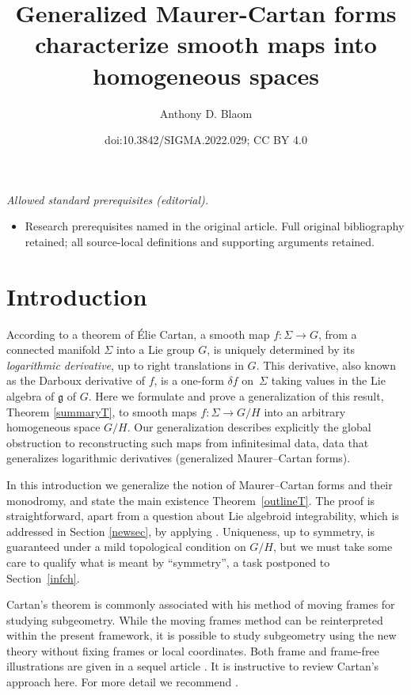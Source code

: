 \documentclass[10pt,a4paper]{amsart}
\title{Generalized Maurer-Cartan forms characterize smooth maps into homogeneous spaces}
\author{Anthony D. Blaom}
\date{doi:10.3842/SIGMA.2022.029; CC BY 4.0}
\numberwithin{equation}{section}
\begin{document}
\maketitle
\noindent\textit{Allowed standard prerequisites (editorial).}\begin{itemize}
\item Research prerequisites named in the original article. Full original bibliography retained; all source-local definitions and supporting arguments retained.
\end{itemize}\medskip
\section{Introduction}%
According to a theorem of \'Elie Cartan, a smooth map $f \colon \Sigma \rightarrow G$, from a
connected manifold $\Sigma$ into a Lie group $G$, is uniquely
determined by its {\it logarithmic derivative}, up to right
translations in $G$. This derivative, also known as the Darboux
derivative of $f$, is a one-form $\delta f$ on~$\Sigma $ taking values
in the Lie algebra of ${\mathfrak g} $ of $G$. Here we formulate and
prove a generalization of this result, Theorem \ref{summaryT}, to
smooth maps $f \colon \Sigma \rightarrow G/H$ into an arbitrary
homogeneous space $G/H$. Our generalization describes explicitly the
global obstruction to reconstructing such maps from infinitesimal
data, data that generalizes logarithmic derivatives (generalized
Maurer--Cartan forms).

In this introduction we generalize the notion of Maurer--Cartan forms
and their monodromy, and state the main existence Theorem~\ref{outlineT}. The proof is straightforward, apart from a question
about Lie algebroid integrability, which is addressed in Section
\ref{newsec}, by applying \cite{Crainic_Fernandes_03}. Uniqueness, up
to symmetry, is guaranteed under a mild topological condition on
$G/H$, but we must take some care to qualify what is meant by
``symmetry'', a task postponed to Section~\ref{infch}.

Cartan's theorem is commonly associated with his method of moving
frames for studying subgeometry. While the moving frames method can
be reinterpreted within the present framework, it is possible to study
subgeometry using the new theory without fixing frames or local
coordinates. Both frame and frame-free illustrations are given in a
sequel article \cite{Blaom_G}. It is instructive to review Cartan's
approach here. For more detail we recommend \cite{Ivey_Landsberg_03}.
\end{document}
